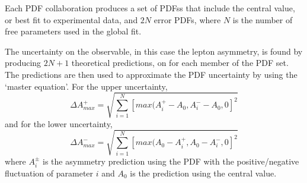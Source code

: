 Each \ac{PDF} collaboration produces a set of \acp{PDFs} that include the
central value, or best fit to experimental data, and $2N$ error \acp{PDF}, where
$N$ is the number of free parameters used in the global fit.\cite{bourilkov}

The uncertainty on the observable, in this case the lepton asymmetry, is found
by producing $2N+1$ theoretical predictions, on for each member of the \ac{PDF}
set. The predictions are then used to approximate the \ac{PDF} uncertainty by
using the `master equation'.\cite{bourilkov} For the upper uncertainty,
\begin{equation}
\Delta A^{+}_{max}
= \sqrt{ \sum^{N}_{i=1} \left[ max( A^{+}_i-A_{0}, A^{-}_i-A_{0}, 0 \right]^{2}}
\end{equation}
and for the lower uncertainty,
\begin{equation}
\Delta A^{-}_{max}
= \sqrt{ \sum^{N}_{i=1} \left[ max( A_{0}-A^{+}_i, A_{0}-A^{-}_i, 0 \right]^{2}}
\end{equation}
where $A^{\pm}_{i}$ is the asymmetry prediction using the \ac{PDF} with the
positive/negative fluctuation of parameter $i$ and $A_{0}$ is the prediction
using the central value.



